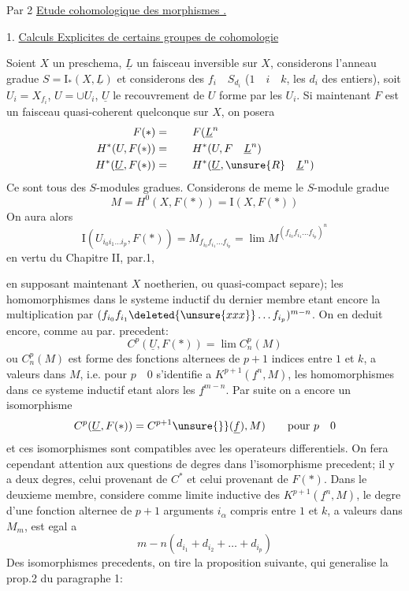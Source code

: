 
Par 2 \uline{Etude cohomologique des morphismes .}

1. \uline{Calculs Explicites de certains groupes de cohomologie}

Soient $X$ un preschema, $\underline L$ un faisceau inversible sur $X$, considerons l'anneau gradue $S=\mathrm I_*(X,\underline L)$ et considerons des $f_i\quad S_{d_i}$ ($1\quad i\quad k$, les $d_i$ des entiers), soit $U_i=X_{f_i}$, $U=\cup U_i$, $\underline U$ le recouvrement  de $U$ forme par les $U_i$. Si maintenant $F$ est un faisceau quasi-coherent quelconque sur $X$, on posera
\[
\begin{aligned}
F(*)&=\qquad F(\underline L^n\\
H^*(U,F(*))&=\qquad H^*(U,F\quad\underline L^n)\\
H^*(\underline U,F(*))&=\qquad H^*(\underline U,\unsure{R}\quad\underline L^n)
\end{aligned}
\]
Ce sont tous des $S$-modules gradues. Considerons de meme le $S$-module gradue
\[
M=H^0(X,F(*))=\mathrm I(X,F(*))
\]
On aura alors
\[
\mathrm I(U_{i_0i_1\ldots i_p},F(*))=M_{f_{i_0}f_{i_1}\ldots f_{i_p}}=\lim M^{(f_{i_0}f_{i_1}\ldots f_{i_p})^n}
\]
en vertu du Chapitre II, par.1,

en supposant maintenant $X$ noetherien, ou quasi-compact separe); les homomorphismes dans le systeme inductif du dernier membre etant encore la multiplication par $(f_{i_0}f_{i_1}\deleted{\unsure{xxx}}\ldots f_{i_p})^{m-n}$. On en deduit encore, comme au par. precedent:
\[
C^p(\underline U,F(*))=\lim C_n^p(M)
\]
ou $C_n^p(M)$ est forme des fonctions alternees de $p+1$ indices entre $1$ et $k$, a valeurs dans $M$, i.e. pour $p\quad0$ s'identifie a $K^{p+1}(\underline f^n,M)$, les homomorphismes dans ce systeme inductif etant alors les $\underline f^{m-n}$. Par suite on a encore un  isomorphisme
\[
C^p(\underline U,F(*))=C^{p+1}\unsure{\}}(\underline f),M)\qquad\text{pour }p\quad0
\]
et ces isomorphismes sont compatibles avec les operateurs differentiels. On fera cependant attention aux questions de degres dans l'isomorphisme precedent; il y a deux degres, celui provenant de $C^*$ et celui provenant de $F(*)$. Dans le deuxieme membre, considere comme limite inductive des $K^{p+1}(\underline f^n,M)$, le  degre d'une fonction  alternee de $p+1$ arguments $i_\alpha$ compris entre $1$ et $k$, a valeurs dans $M_m$, est egal a
\[
m-n(d_{i_1}+d_{i_2}+\ldots+d_{i_p})
\]
Des isomorphismes precedents, on tire la proposition suivante, qui generalise la prop.2 du paragraphe 1:
